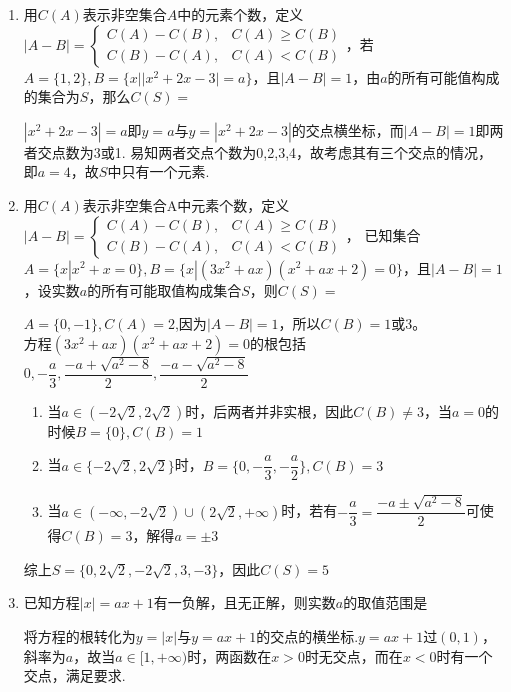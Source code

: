 \begin{enumerate}
\begin{jieda}
        因为$-\dfrac{1}{4}(m \cdot (\sqrt{1+8m} - 1))$在$m \in \left(0, \dfrac{1}{4}\right)$单调递减，故其取值范围是$\left(-\dfrac{\sqrt{3} - 1}{16}, 0\right)$
    \end{jieda}
    \item 用$C(A)$表示非空集合$A$中的元素个数，定义$|A-B| = \left \{ \begin{array}{ll}
        C(A) - C(B), & C(A) \geq C(B) \\
        C(B) - C(A), & C(A) < C(B)
    \end{array}\right.$，若$A = \{1,2\}, B = \{x | |x^2+2x-3| = a\}$，且$|A-B| = 1$，由$a$的所有可能值构成的集合为$S$，那么$C(S) = $
    \begin{jieda}
        $|x^2+2x-3| = a$即$y = a$与$y = |x^2+2x-3|$的交点横坐标，而$|A-B| = 1$即两者交点数为3或1. 易知两者交点个数为0,2,3,4，故考虑其有三个交点的情况，即$a = 4$，故$S$中只有一个元素.
    \end{jieda}
    \item 用$C(A)$表示非空集合A中元素个数，定义$|A-B| = \left \{ \begin{array}{ll}
         C(A)-C(B),& C(A) \geq C(B)  \\
         C(B)-C(A),& C(A) < C(B)
    \end{array}\right.$，
    已知集合$A = \{x | x^2 + x = 0\}, B = \{x | (3x^2+ax)(x^2+ax+2) = 0\}$，且$|A-B|=1$，设实数$a$的所有可能取值构成集合$S$，则$C(S) = $
    \begin{jieda}
        $A = \{0, -1\}, C(A) = 2$,因为$|A-B| = 1$，所以$C(B) = 1 \mbox{或} 3$。 \\
        方程$(3x^2+ax)(x^2+ax+2) = 0$的根包括$0, -\dfrac{a}{3}, \dfrac{-a+\sqrt{a^2-8}}{2}, \dfrac{-a-\sqrt{a^2-8}}{2}$ 
        \begin{enumerate}
            \item 当$a \in (-2\sqrt{2}, 2\sqrt{2})$时，后两者并非实根，因此$C(B) \neq 3$，当$a = 0$的时候$B = \{0\}, C(B) = 1$
            \item 当$a \in \{-2\sqrt{2}, 2\sqrt{2}\}$时，$B = \{0, -\dfrac{a}{3}, -\dfrac{a}{2}\}, C(B) = 3$
            \item 当$a \in (-\infty, -2\sqrt{2}) \cup (2\sqrt{2}, +\infty)$时，若有$-\dfrac{a}{3} = \dfrac{-a \pm \sqrt{a^2-8}}{2}$可使得$C(B) = 3$，解得$a = \pm 3$
        \end{enumerate}
        综上$S = \{0, 2\sqrt{2}, -2\sqrt{2}, 3, -3\}$，因此$C(S) = 5$
    \end{jieda} 
    
    \item 已知方程$|x| = ax+1$有一负解，且无正解，则实数$a$的取值范围是\blkda{$[1, +\infty)$ }
    \begin{jieda}
        将方程的根转化为$y = |x|$与$y = ax+1$的交点的横坐标.$y = ax+1$过$(0, 1)$，斜率为$a$，故当$a \in [1, +\infty)$时，两函数在$x > 0$时无交点，而在$x < 0$时有一个交点，满足要求.
    \end{jieda}
    

\end{enumerate}

